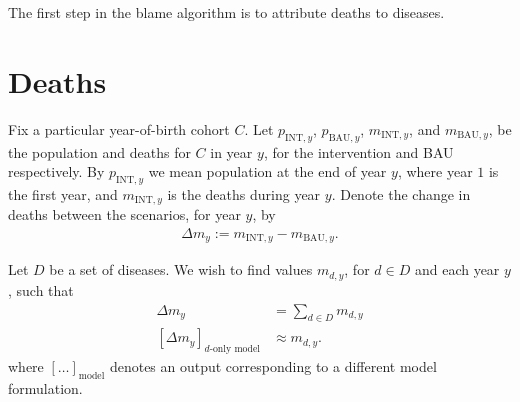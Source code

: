 \documentclass[]{article}
\begin{document}
The first step in the blame algorithm is to attribute deaths to diseases.

\section{Deaths}

Fix a particular year-of-birth cohort $C$. Let $p_{\text{INT}, y}$, $p_{\text{BAU}, y}$, $m_{\text{INT}, y}$, and $m_{\text{BAU}, y}$, be the population and deaths for $C$ in year $y$, for the intervention and BAU respectively. By $p_{\text{INT}, y}$ we mean population at the end of year $y$, where year $1$ is the first year, and $m_{\text{INT}, y}$ is the deaths during year $y$. Denote the change in deaths between the scenarios, for year $y$, by
\begin{align*}
	\Delta m_y := m_{\text{INT}, y} - m_{\text{BAU}, y}.
\end{align*}

Let $D$ be a set of diseases. We wish to find values $m_{d, y}$, for $d \in D$ and each year $y$, such that
\begin{align*}
	\Delta m_y &= \sum_{d \in D} m_{d, y} \\
	[\Delta m_y]_\text{$d$-only model} &\approx m_{d, y}.
\end{align*}
where $[\ldots]_\text{model}$ denotes an output corresponding to a different model formulation.
\end{document}
